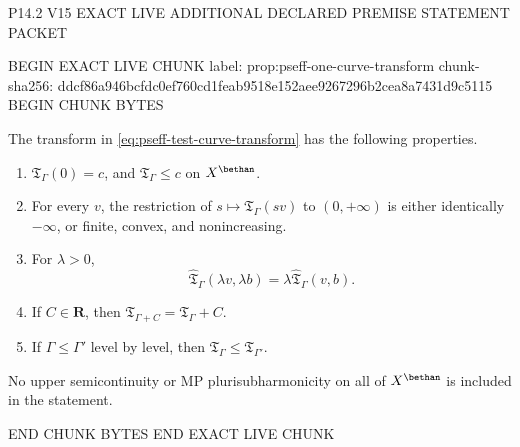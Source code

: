 P14.2 V15 EXACT LIVE ADDITIONAL DECLARED PREMISE STATEMENT PACKET

BEGIN EXACT LIVE CHUNK
label: prop:pseff-one-curve-transform
chunk-sha256: ddcf86a946bcfdc0ef760cd1feab9518e152aee9267296b2cea8a7431d9c5115
BEGIN CHUNK BYTES
\begin{proposition}\label{prop:pseff-one-curve-transform}
The transform in \eqref{eq:pseff-test-curve-transform} has the following
properties.
\begin{enumerate}
\item \(\mathfrak T_\Gamma(0)=c\), and
      \(\mathfrak T_\Gamma\leq c\) on \(X^{\bethan}\).
\item For every \(v\), the restriction of
      \(s\mapsto\mathfrak T_\Gamma(sv)\) to \((0,+\infty)\) is either
      identically \(-\infty\), or finite, convex, and nonincreasing.
\item For \(\lambda>0\),
      \[
       \widehat{\mathfrak T}_\Gamma(\lambda v,\lambda b)
       =\lambda\widehat{\mathfrak T}_\Gamma(v,b).
      \tag{71.14}\label{eq:pseff-joint-homogeneity}
      \]
\item If \(C\in\mathbf R\), then
      \(\mathfrak T_{\Gamma+C}=\mathfrak T_\Gamma+C\).
\item If \(\Gamma\leq\Gamma'\) level by level, then
      \(\mathfrak T_\Gamma\leq\mathfrak T_{\Gamma'}\).
\end{enumerate}
No upper semicontinuity or MP plurisubharmonicity on all of
\(X^{\bethan}\) is included in the statement.
\end{proposition}
END CHUNK BYTES
END EXACT LIVE CHUNK
